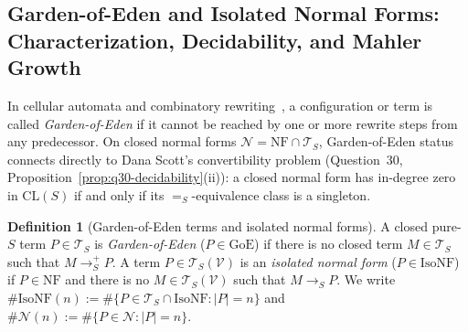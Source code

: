 \documentclass[11pt,reqno]{amsart}
\numberwithin{equation}{section}
\theoremstyle{plain}
\theoremstyle{definition}
\newtheorem{definition}[theorem]{Definition}
\theoremstyle{remark}
\newcommand{\CLS}{\mathrm{CL}(S)}
\newcommand{\TS}{\mathcal{T}_S}
\newcommand{\TSV}{\mathcal{T}_S(\mathcal{V})}
\newcommand{\NF}{\mathrm{NF}}
\newcommand{\redS}{\to_S}
\newcommand{\redSp}{\to_S^+}
\newcommand{\convS}{=_S}
\begin{document}
\subsection{Garden-of-Eden and Isolated Normal Forms: Characterization, Decidability, and Mahler Growth}
\label{subsec:goe-isolated}

In cellular automata and combinatory rewriting~\cite{Wolfram2002NKS,Wolfram2021CombinatorsBook}, a configuration or term is called \emph{Garden-of-Eden} if it cannot be reached by one or more rewrite steps from any predecessor. On closed normal forms $\mathcal{N} = \NF \cap \TS$, Garden-of-Eden status connects directly to Dana Scott's convertibility problem (Question~30, Proposition~\ref{prop:q30-decidability}(ii)): a closed normal form has in-degree zero in $\CLS$ if and only if its $\convS$-equivalence class is a singleton.

\begin{definition}[Garden-of-Eden terms and isolated normal forms]
\label{def:goe-isolated}
A closed pure-$S$ term $P \in \TS$ is \emph{Garden-of-Eden} ($P \in \mathrm{GoE}$) if there is no closed term $M \in \TS$ such that $M \redSp P$. A term $P \in \TSV$ is an \emph{isolated normal form} ($P \in \mathrm{IsoNF}$) if $P \in \NF$ and there is no $M \in \TSV$ such that $M \redS P$. We write $\#\mathrm{IsoNF}(n) := \#\{ P \in \TS \cap \mathrm{IsoNF} : |P| = n \}$ and $\#\mathcal{N}(n) := \#\{ P \in \mathcal{N} : |P| = n \}$.
\end{definition}
\end{document}
